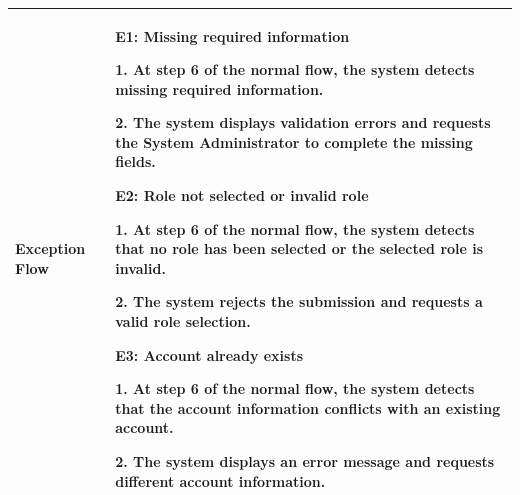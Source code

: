 \begin{longtable}{|>{\bfseries\raggedright\arraybackslash}p{}|>{\raggedright\arraybackslash}p{}|}
Exception Flow &
\textbf{E1: Missing required information} \par
1. At step 6 of the normal flow, the system detects missing required information. \par
2. The system displays validation errors and requests the System Administrator to complete the missing fields. \par\vspace{4pt}
\textbf{E2: Role not selected or invalid role} \par
1. At step 6 of the normal flow, the system detects that no role has been selected or the selected role is invalid. \par
2. The system rejects the submission and requests a valid role selection. \par\vspace{4pt}
\textbf{E3: Account already exists} \par
1. At step 6 of the normal flow, the system detects that the account information conflicts with an existing account. \par
2. The system displays an error message and requests different account information. \\ \hline
\end{longtable}


